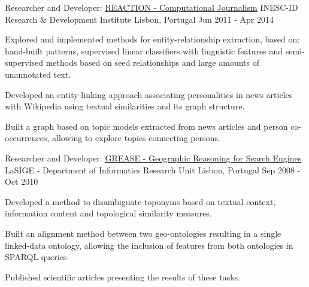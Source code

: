 \begin{cventries}
  \cventry
    {Researcher and Developer: \href{http://arquivo.pt/wayback/20151118124735/http://dmir.inesc-id.pt/project/Reaction}{REACTION - Computational Journalism}} %
    {INESC-ID Research \& Development Institute} %
    {Lisbon, Portugal} %
    {Jun 2011 - Apr 2014} %
    {
      \begin{cvitems} %
        \item {Explored and implemented methods for entity-relationship extraction, based on: hand-built patterns, supervised linear classifiers with linguistic features and semi-supervised methods based on seed relationships and large amounts of unannotated text.}
		\item {Developed an entity-linking approach associating personalities in news articles with Wikipedia using textual similarities and its graph structure.}
        \item {Built a graph based on topic models extracted from news articles and person co-occurrences, allowing to explore topics connecting persons.}
      \end{cvitems}
    }


  \cventry
    {Researcher and Developer: \href{https://arquivo.pt/wayback/20181014115718/http://xldb.di.fc.ul.pt/wiki/Grease}{GREASE - Geographic Reasoning for Search Engines}} %
    {LaSIGE - Department of Informatics Research Unit } %
    {Lisbon, Portugal} %
    {Sep 2008 - Oct 2010} %
    {
      \begin{cvitems} %
        \item {Developed a method to disambiguate toponyms based on textual context, information content and topological similarity measures.}
        \item {Built an alignment method between two geo-ontologies resulting in a single linked-data ontology, allowing the inclusion of features from both ontologies in SPARQL queries.}
		\item {Published scientific articles presenting the results of these tasks.}
      \end{cvitems}
    }


\end{cventries}
